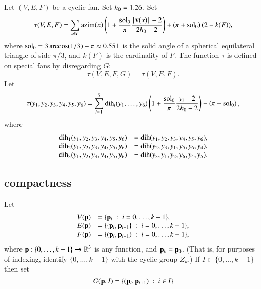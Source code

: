 \begin{definition}\label{def:tau}
Let $(V,E,F)$ be a cyclic fan.  Set ${h_0} = 1.26$.  Set
$$
\tau(V,E,F) =\sum_{x\in F} {\operatorname{azim}}(x)\left(1 + \frac{\displaystyle \operatorname{sol}_0}{\displaystyle \pi}  \frac{\displaystyle {{\hskip0.1em|\hskip-0.15em|\hskip0.1em}{\mathbf v}(x){\hskip0.1em|\hskip-0.15em|\hskip0.1em}}-2}{\displaystyle 2{h_0}-2}\right) + \left(\pi+{\operatorname{sol}_0}\right) (2- k(F)),
$$
where  $\operatorname{sol}_0=3\arccos(1/3)-\pi\approx0.551$ is the solid angle of a spherical equilateral triangle of side $\pi/3$, and $k(F)$ is the cardinality of $F$.
The function $\tau$ is defined on special fans by disregarding $G$:
$$
\tau(V,E,F,G) = \tau(V,E,F).
$$
Let 
$$
\tau(y_1,y_2,y_3,y_4,y_5,y_6) =
\sum_{i=1}^3 \operatorname{dih}_i(y_1,\ldots,y_6)\left(1 + \frac{\displaystyle \operatorname{sol}_0}{\displaystyle \pi}  \frac{\displaystyle y_i -2}{\displaystyle 2{h_0}-2}\right) - \left(\pi+{\operatorname{sol}_0}\right),
$$
where
$$
\begin{array}{lll}
\operatorname{dih}_1(y_1,y_2,y_3,y_4,y_5,y_6) &= \operatorname{dih}(y_1,y_2,y_3,y_4,y_5,y_6),\\
\operatorname{dih}_2(y_1,y_2,y_3,y_4,y_5,y_6) &= \operatorname{dih}(y_2,y_3,y_1,y_5,y_6,y_4),\\
\operatorname{dih}_3(y_1,y_2,y_3,y_4,y_5,y_6) &= \operatorname{dih}(y_3,y_1,y_2,y_6,y_4,y_5).\\
\end{array}
$$
\end{definition}



\subsection{compactness}

Let 
$$
\begin{array}{lll}
V({\mathbf p}) &= \{{\mathbf p}_{i}\ :\  i=0,\ldots,k-1\},\\
E({\mathbf p}) &= \{\{{\mathbf p}_{i},{\mathbf p}_{i+1}\}\ :\  i=0,\ldots,k-1\},\\
F({\mathbf p}) &= \{({\mathbf p}_{i},{\mathbf p}_{i+1}) \ :\  i=0,\ldots,k-1\},\\
\end{array}
$$
where
 ${\mathbf p}:\{0,\ldots,k-1\}\to \mathbb{R}^3$ is any function, and
${\mathbf p}_k = {\mathbf p}_0$.  (That is, for purposes of indexing, identify $\{0,\ldots,k-1\}$ with
the cyclic group $Z_k$.)
If $I\subset\{0,\ldots,k-1\}$ then set 
$$G({\mathbf p},I) = \{({\mathbf p}_i ,{\mathbf p}_{i+1}) \ :\  i\in I\}$$


